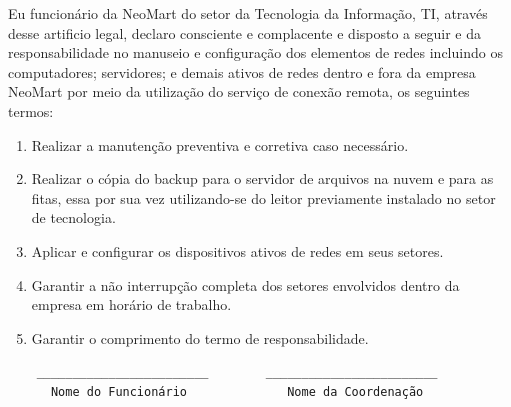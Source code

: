 \documentclass[12pt]{article}
\begin{document}
Eu funcionário da NeoMart do setor da Tecnologia da Informação, TI, através desse artificio legal, declaro consciente e complacente e disposto a seguir e da responsabilidade no manuseio e configuração dos elementos de redes incluindo os computadores; servidores; e demais ativos de redes dentro e fora da empresa NeoMart por meio da utilização do serviço de conexão remota, os seguintes termos:

\begin{enumerate}
    \item Realizar a manutenção preventiva e corretiva caso necessário.
    \item Realizar o cópia do backup para o servidor de arquivos na nuvem e para as fitas, essa por sua vez utilizando-se do leitor previamente instalado no setor de tecnologia.
    \item Aplicar e configurar os dispositivos ativos de redes em seus setores.
    \item Garantir a não interrupção completa dos setores envolvidos dentro da empresa em horário de trabalho.
    \item Garantir o comprimento do termo de responsabilidade.
\end{enumerate}
    
\begin{verbatim}
    ________________________        ________________________
      Nome do Funcionário              Nome da Coordenação
\end{verbatim}
\end{document}
